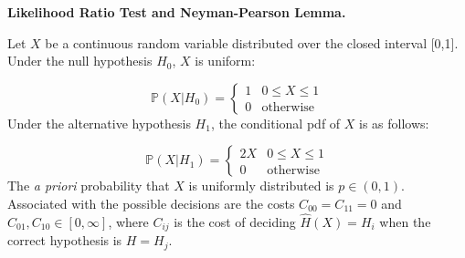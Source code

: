 \documentclass[12pt, addpoints]{exam}
\theoremstyle{plain}
\begin{document}
\begin{questions}


\question[20] \textbf{Likelihood Ratio Test and Neyman-Pearson Lemma.}

Let $X$ be a continuous random variable distributed over the closed interval [0,1]. Under the null hypothesis $H_0$,  $X$ is uniform: 

\[ \mathbb{P}(X|H_0)=
\begin{cases} 
      1 & 0\leq X \leq 1 \\
      0 & \text{otherwise}
   \end{cases}
\]
Under the alternative hypothesis $H_1$, the conditional pdf of $X$ is as follows:

\[ \mathbb{P}(X|H_1)=
\begin{cases} 
      2X & 0\leq X \leq 1 \\
      0 & \text{otherwise}
   \end{cases}
\]
The \textsl{a priori} probability that  $X$ is uniformly distributed is $p \in (0, 1)$. Associated with the possible decisions are the costs $C_{00} = C_{11} = 0$ and $C_{01}, C_{10} \in [0,  \infty]$, where $C_{ij}$ is the cost of deciding $\hat{H}(X) = H_i$ when the correct hypothesis is $H = H_j$.
\end{questions}
\end{document}
